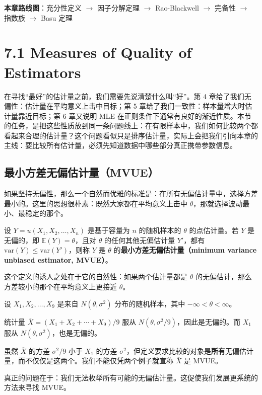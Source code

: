 \textbf{本章路线图}：充分性定义 $\to$ 因子分解定理 $\to$ Rao-Blackwell $\to$ 完备性 $\to$ 指数族 $\to$ Basu 定理

\section{7.1 Measures of Quality of Estimators}\label{sec:7.1}

在寻找``最好''的估计量之前，我们需要先说清楚什么叫``好''。第 4 章给了我们无偏性：估计量在平均意义上击中目标；第 5 章给了我们一致性：样本量增大时估计量靠近目标；第 6 章又说明 MLE 在正则条件下通常有良好的渐近性质。本节的任务，是把这些性质放到同一条问题线上：在有限样本中，我们如何比较两个都看起来合理的估计量？这个问题看似只是排序估计量，实际上会把我们引向本章的主线：要比较所有估计量，必须先知道数据中哪些部分真正携带参数信息。

\subsection{最小方差无偏估计量（MVUE）}

如果坚持无偏性，那么一个自然而优雅的标准是：在所有无偏估计量中，选择方差最小的。这里的思想很朴素：既然大家都在平均意义上击中 $\theta$，那就选择波动最小、最稳定的那个。

\begin{definition}\label{def:mvue}
设 $Y = u(X_1, X_2, \ldots, X_n)$ 是基于容量为 $n$ 的随机样本的 $\theta$ 的点估计量。若 $Y$ 是无偏的，即 $\mathbb{E}(Y) = \theta$，且对 $\theta$ 的任何其他无偏估计量 $Y'$，都有 $\text{var}(Y) \leq \text{var}(Y')$，则称 $Y$ 是 $\theta$ 的\textbf{最小方差无偏估计量（minimum variance unbiased estimator, MVUE）}。
\end{definition}

这个定义的诱人之处在于它的自然性：如果两个估计量都是 $\theta$ 的无偏估计，那么方差较小的那个在平均意义上更接近 $\theta$。

\begin{example}\label{ex:mvue-normal}
设 $X_1, X_2, \ldots, X_9$ 是来自 $N(\theta, \sigma^2)$ 分布的随机样本，其中 $-\infty < \theta < \infty$。

统计量 $\overline{X} = (X_1 + X_2 + \cdots + X_9)/9$ 服从 $N(\theta, \sigma^2/9)$，因此是无偏的。而 $X_1$ 服从 $N(\theta, \sigma^2)$，也是无偏的。

虽然 $\overline{X}$ 的方差 $\sigma^2/9$ 小于 $X_1$ 的方差 $\sigma^2$，但定义要求比较的对象是\textbf{所有}无偏估计量，而不仅仅是这两个。我们不能仅凭两个例子就宣称 $\overline{X}$ 是 MVUE。

真正的问题在于：我们无法枚举所有可能的无偏估计量。这促使我们发展更系统的方法来寻找 MVUE。
\end{example}

